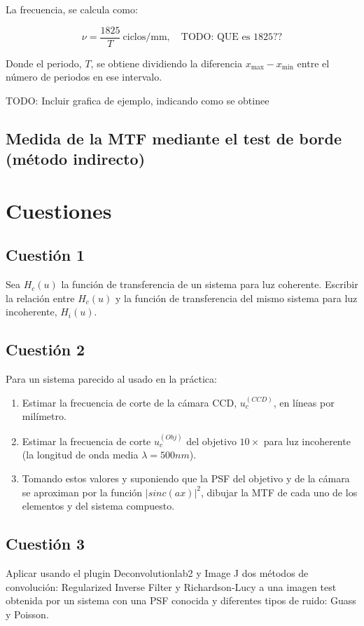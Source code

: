 \documentclass{../packages/optica-article}
\begin{document}
La frecuencia, se calcula como:

\begin{equation}
	\nu = \frac{1825}{T}\ \textrm{ciclos/mm},\quad\textrm{TODO: QUE es 1825??}
	\label{eq:frecuencia}
\end{equation}

Donde el periodo, $T$, se obtiene dividiendo la diferencia $x_{\max} - x_{\min}$ entre el número de periodos en ese intervalo.

TODO: Incluir grafica de ejemplo, indicando como se obtinee

\subsection{Medida de la MTF mediante el test de borde (método indirecto)}

\section{Cuestiones}

\subsection{Cuestión 1}
Sea $H_{c}(u)$ la función de transferencia de un sistema para luz coherente. Escribir la relación entre $H_{c}(u)$ y la función de transferencia del mismo sistema para luz incoherente, $H_{i}(u)$.


\subsection{Cuestión 2}
Para un sistema parecido al usado en la práctica:
\begin{enumerate}
	\item Estimar la frecuencia de corte de la cámara CCD, $u_{c}^{(CCD)}$, en líneas por milímetro.

	\item Estimar la frecuencia de corte $u_{c}^{(Obj)}$ del objetivo $10\times$ para luz incoherente (la longitud de onda media $\lambda=500nm$).

	\item Tomando estos valores y suponiendo que la PSF del objetivo y de la cámara se aproximan por la función $|sinc(ax)|^2$, dibujar la MTF de cada uno de los elementos y del sistema compuesto.
\end{enumerate}


\subsection{Cuestión 3}
Aplicar usando el plugin Deconvolutionlab2 y Image J dos métodos de convolución: Regularized Inverse Filter y Richardson-Lucy a una imagen test obtenida por un sistema con una PSF conocida y diferentes tipos de ruido: Guass y Poisson.


\end{document}

